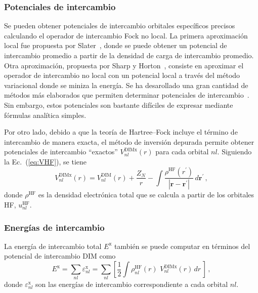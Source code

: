 \subsubsection*{Potenciales de intercambio}

Se pueden obtener potenciales de intercambio orbitales específicos 
precisos calculando el operador de intercambio Fock no local. La primera 
aproximación local fue propuesta por Slater~\cite{Slater:51}, donde se 
puede obtener un potencial de intercambio promedio a partir de la 
densidad de carga de intercambio promedio. Otra aproximación, propuesta
por Sharp y Horton~\cite{Sharp:53}, consiste en aproximar el operador de
intercambio no local con un potencial local a través del método 
variacional donde se miniza la energía. Se ha desarollado una gran 
cantidad de métodos más elaborados que permiten determinar potenciales 
de intercambio~\cite{Krieger:92,Gorling:92,Yang:02,Staroverov:06,
Ryabinkin:13}. Sin embargo, estos potenciales son bastante difíciles de 
expresar mediante fórmulas analítica simples.

Por otro lado, debido a que la teoría de Hartree--Fock incluye el 
término de intercambio de manera exacta, el método de inversión depurada 
permite obtener potenciales de intercambio ``exactos'' 
$V_{nl}^{\mathrm{DIMx}}(r)$ para cada orbital $nl$. Siguiendo la  
Ec.~(\ref{eq:VHF}), se tiene 
\begin{equation}
V_{nl}^{\mathrm{DIMx}}(r)=V_{nl}^{\mathrm{DIM}}(r)+\frac{Z_{N}}{r}
-\int{ \frac{\rho^{\mathrm{HF}}(r^{\prime})  }
{\left| \mathbf{r} - \mathbf{r^{\prime}} \right|}} \, 
d \mathbf{r^{\prime}} \, ,
\label{eq:exchange-potential}
\end{equation}
donde $\rho^{\mathrm{HF}}$ es la densidad electrónica total que se
calcula a partir de los orbitales HF, $u^{\mathrm{HF}}_{nl}$.

\subsubsection*{Energías de intercambio}

La energía de intercambio total $E^{\mathrm{x}}$ también se puede 
computar en términos del potencial de intercambio DIM como
\begin{equation}
E^{\mathrm{x}} = \sum_{nl}\varepsilon_{nl}^{\mathrm{x}} = 
\sum_{nl}\left[\frac{1}{2}\int{\rho^{\mathrm{HF}}_{nl}(r) \, \, 
V_{nl}^{\mathrm{DIMx}}}(r) \, dr \, \right]\,,
\label{eq:exchange-energy}
\end{equation}
donde $\varepsilon_{nl}^{\mathrm{x}}$ son las energías de intercambio 
correspondiente a cada orbital $nl$.


